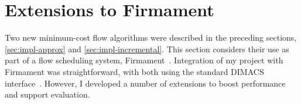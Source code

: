 %
%
%
%
%
%
%
%
%
%
%

\section{Extensions to Firmament} \label{sec:impl-firmament}


Two new minimum-cost flow algorithms were described in the preceding sections, \cref{sec:impl-approx} and \cref{sec:impl-incremental}. This section considers their use as part of a flow scheduling system, Firmament~\cite[ch.~5]{Schwarzkopf:2015}. Integration of my project with Firmament was straightforward, with both using the standard DIMACS interface~\cite{DIMACSStandard}. However, I developed a number of extensions to boost performance and support evaluation.


